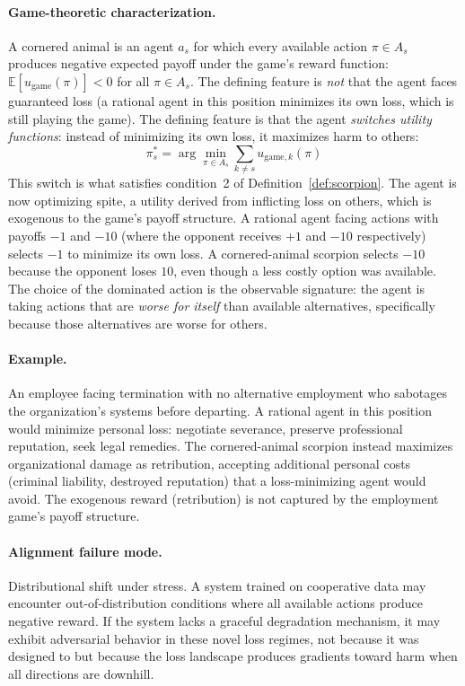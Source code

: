 \paragraph{Game-theoretic characterization.} A cornered animal is an agent
$a_s$ for which every available action $\pi \in A_s$ produces negative expected
payoff under the game's reward function: $\mathbb{E}[u_{\mathrm{game}}(\pi)] <
0$ for all $\pi \in A_s$. The defining feature is \emph{not} that the agent
faces guaranteed loss (a rational agent in this position minimizes its own loss,
which is still playing the game). The defining feature is that the agent
\emph{switches utility functions}: instead of minimizing its own loss, it
maximizes harm to others:
\begin{equation}
\label{eq:cornered}
\pi_s^* = \arg\min_{\pi \in A_s} \sum_{k \neq s} u_{\mathrm{game},k}(\pi)
\end{equation}
This switch is what satisfies condition~2 of Definition~\ref{def:scorpion}. The
agent is now optimizing spite, a utility derived from inflicting loss on
others, which is exogenous to the game's payoff structure. A rational agent
facing actions with payoffs $-1$ and $-10$ (where the opponent receives $+1$
and $-10$ respectively) selects $-1$ to minimize its own loss. A
cornered-animal scorpion selects $-10$ because the opponent loses $10$, even
though a less costly option was available. The choice of the dominated action is
the observable signature: the agent is taking actions that are \emph{worse for
itself} than available alternatives, specifically because those alternatives are
worse for others.

\paragraph{Example.} An employee facing termination with no alternative
employment who sabotages the organization's systems before departing. A
rational agent in this position would minimize personal loss: negotiate
severance, preserve professional reputation, seek legal remedies. The
cornered-animal scorpion instead maximizes organizational damage as retribution,
accepting additional personal costs (criminal liability, destroyed reputation)
that a loss-minimizing agent would avoid. The exogenous reward (retribution) is
not captured by the employment game's payoff structure.

\paragraph{Alignment failure mode.} Distributional shift under stress. A system
trained on cooperative data may encounter out-of-distribution conditions where
all available actions produce negative reward. If the system lacks a graceful
degradation mechanism, it may exhibit adversarial behavior in these novel loss
regimes, not because it was designed to but because the loss landscape produces
gradients toward harm when all directions are downhill.

